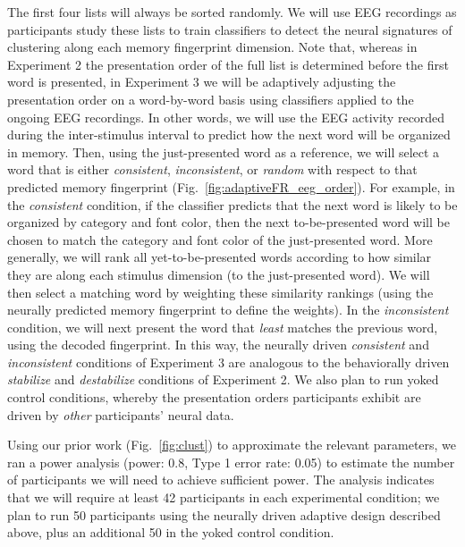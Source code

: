 The first four lists will always be sorted randomly.  We will use EEG recordings as participants study these lists to train classifiers to detect the neural signatures of clustering along each memory fingerprint dimension.  Note that, whereas in Experiment 2 the presentation order of the full list is determined before the first word is presented, in Experiment 3 we will be adaptively adjusting the presentation order on a word-by-word basis using classifiers applied to the ongoing EEG recordings.  In other words, we will use the EEG activity recorded during the inter-stimulus interval to predict how the next word will be organized in memory.  Then, using the just-presented word as a reference, we will select a word that is either \textit{consistent}, \textit{inconsistent}, or \textit{random} with respect to that predicted memory fingerprint (Fig.~\ref{fig:adaptiveFR_eeg_order}).  For example, in the \textit{consistent} condition, if the classifier predicts that the next word is likely to be organized by category and font color, then the next to-be-presented word will be chosen to match the category and font color of the just-presented word.  More generally, we will rank all yet-to-be-presented words according to how similar they are along each stimulus dimension (to the just-presented word).  We will then select a matching word by weighting these similarity rankings (using the neurally predicted memory fingerprint to define the weights).  In the \textit{inconsistent} condition, we will next present the word that \textit{least} matches the previous word, using the decoded fingerprint.  In this way, the neurally driven \textit{consistent} and \textit{inconsistent} conditions of Experiment 3 are analogous to the behaviorally driven \textit{stabilize} and \textit{destabilize} conditions of Experiment 2.  We also plan to run yoked control conditions, whereby the presentation orders participants exhibit are driven by \textit{other} participants' neural data.

Using our prior work (Fig.~\ref{fig:clust}) to approximate the relevant parameters, we ran a power analysis (power: 0.8, Type 1 error rate: 0.05) to estimate the number of participants we will need to achieve sufficient power.  The analysis indicates that we will require at least 42 participants in each experimental condition; we plan to run 50 participants using the neurally driven adaptive design described above, plus an additional 50 in the yoked control condition.

